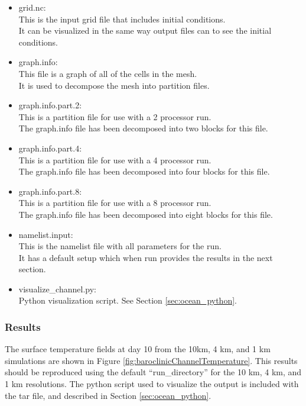 \begin{itemize}
	\item grid.nc: \\
		This is the input grid file that includes initial conditions.  \\
		It can be visualized in the same way output files can to see the initial conditions.
	\item graph.info: \\
		This file is a graph of all of the cells in the mesh. \\
		It is used to decompose the mesh into partition files.
	\item graph.info.part.2: \\
		This is a partition file for use with a 2 processor run. \\
		The graph.info file has been decomposed into two blocks for this file.
	\item graph.info.part.4: \\
		This is a partition file for use with a 4 processor run. \\
		The graph.info file has been decomposed into four blocks for this file.
	\item graph.info.part.8: \\
		This is a partition file for use with a 8 processor run. \\
		The graph.info file has been decomposed into eight blocks for this file.
	\item namelist.input: \\
		This is the namelist file with all parameters for the run. \\
		It has a default setup which when run provides the results in the next section.
	\item visualize\_channel.py: \\
		Python visualization script.  See Section \ref{sec:ocean_python}.
\end{itemize}

\subsubsection{Results}
\label{subsubsecc:baroclinic_channel_results}
The surface temperature fields at day 10 from the 10km, 4 km, and 1 km simulations are shown in Figure \ref{fig:baroclinicChannelTemperature}.
This results should be reproduced using the default ``run\_directory'' for the 10 km, 4 km, and 1 km resolutions. The python script used to visualize the output is included with the tar file, and described in Section \ref{sec:ocean_python}.

